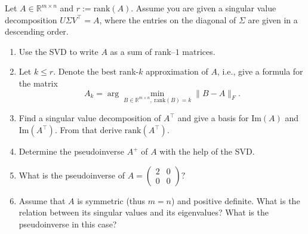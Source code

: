  Let $A \in \mathbb{R}^{m \times n}$ and $r:=\text{rank}(A)$. Assume you are given a singular value decomposition 
 $U \Sigma V^\top = A$, where the 
 entries on the diagonal of $\Sigma$ are given in a descending order.
 \begin{enumerate}
 	\item Use the SVD to write $A$ as a sum of rank--$1$ matrices.
 	\item Let $k \leq r$. Denote the best rank-$k$ approximation of $A$, i.e., give a formula for the matrix
 	$$A_k = \arg \min_{B \in  \mathbb{R}^{m \times n},~ \text{rank}(B)=k  } \|B-A\|_F.$$ 
 	\item Find a singular value decomposition of $A^\top$ and give a basis for $\text{Im}(A)$ and $\text{Im}(A^\top)$.	From that derive $\text{rank}(A^\top)$.	
 	\item Determine the pseudoinverse $A^+$ of $A$ with the help of the SVD. 
 	\item What is the pseudoinverse of $A = \begin{pmatrix}
 	2 & 0\\0&0
 	\end{pmatrix}?$
 	\item Assume that $A$ is symmetric (thus $m=n$) and positive definite. What is the relation between its singular values and its eigenvalues? What is the pseudoinverse in this case?
 \end{enumerate}